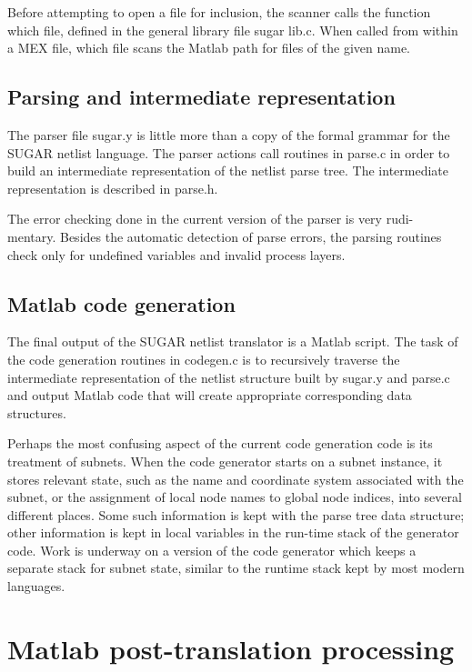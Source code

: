 Before attempting to open a file for inclusion, the scanner calls the function
which file, defined in the general library file sugar lib.c. When called from
within a MEX file, which file scans the Matlab path for files of the given
name.

\subsection{Parsing and intermediate representation}

The parser file sugar.y is little more than a copy of the formal grammar for
the SUGAR netlist language. The parser actions call routines in parse.c in
order to build an intermediate representation of the netlist parse tree. The
intermediate representation is described in parse.h.

The error checking done in the current version of the parser is very rudi-
mentary. Besides the automatic detection of parse errors, the parsing routines
check only for undefined variables and invalid process layers.

\subsection{Matlab code generation}

The final output of the SUGAR netlist translator is a Matlab script. The
task of the code generation routines in codegen.c is to recursively traverse
the intermediate representation of the netlist structure built by sugar.y and
parse.c and output Matlab code that will create appropriate corresponding
data structures.

Perhaps the most confusing aspect of the current code generation code is its
treatment of subnets. When the code generator starts on a subnet instance, it
stores relevant state, such as the name and coordinate system associated with
the subnet, or the assignment of local node names to global node indices, into
several different places. Some such information is kept with the parse tree data
structure; other information is kept in local variables in the run-time stack of
the generator code. Work is underway on a version of the code generator which
keeps a separate stack for subnet state, similar to the runtime stack kept by
most modern languages.

\section{Matlab post-translation processing}

